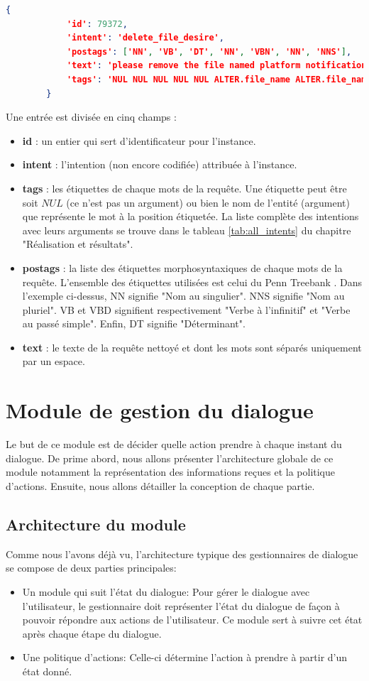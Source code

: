 		\begin{lstlisting}[language=json]
		{
			'id': 79372,
			'intent': 'delete_file_desire',
			'postags': ['NN', 'VB', 'DT', 'NN', 'VBN', 'NN', 'NNS'],
			'text': 'please remove the file named platform notifications',
			'tags': 'NUL NUL NUL NUL NUL ALTER.file_name ALTER.file_name'
		}
		\end{lstlisting}
		\par
		Une entrée est divisée en cinq champs :
		\begin{itemize}
			\item \textbf{id} : un entier qui sert d'identificateur pour l'instance.
			\item \textbf{intent} : l'intention (non encore codifiée) attribuée à l'instance.
			\item \textbf{tags} : les étiquettes de chaque mots de la requête. Une étiquette peut être soit $NUL$ (ce n'est pas un argument) ou bien le nom de l'entité (argument) que représente le mot à la position étiquetée. La liste complète des intentions avec leurs arguments se trouve dans le tableau \ref{tab:all_intents} du chapitre "Réalisation et résultats".
			\item \textbf{postags} : la liste des étiquettes morphosyntaxiques de chaque mots de la requête. L'ensemble des étiquettes utilisées est celui du Penn Treebank \citep{penn_treebank}. Dans l'exemple ci-dessus, NN signifie "Nom au singulier". NNS signifie "Nom au pluriel". VB et VBD signifient respectivement "Verbe à l'infinitif" et "Verbe au passé simple". Enfin, DT signifie "Déterminant".
			\item \textbf{text} : le texte de la requête nettoyé et dont les mots sont séparés uniquement par un espace.
		\end{itemize}
\section{Module de gestion du dialogue}
Le but de ce module est de décider quelle action prendre à chaque instant du dialogue. De prime abord, nous allons présenter l'architecture globale de ce module notamment la représentation des informations reçues et la politique d'actions. Ensuite, nous allons détailler la conception de chaque partie.
\subsection{Architecture du module}
Comme nous l'avons déjà vu, l'architecture typique des gestionnaires de dialogue se compose de deux parties principales: 
\begin{itemize}
	\item Un module qui suit l'état du dialogue: Pour gérer le dialogue avec l'utilisateur, le gestionnaire doit représenter l'état du dialogue de façon à pouvoir répondre aux actions de l'utilisateur. Ce module sert à suivre cet état après chaque étape du dialogue.
	\item Une politique d'actions: Celle-ci détermine l'action à prendre à partir d'un état donné.
\end{itemize}
